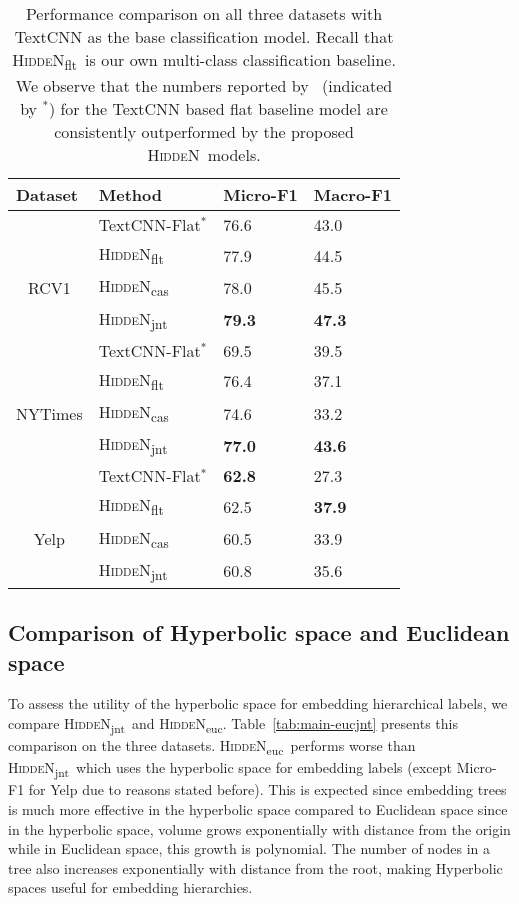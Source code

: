 \documentclass[11pt,a4paper]{article}
\newcommand{\model}{\mbox{\textsc{HiddeN}}}
\newcommand{\modeljnt}{\mbox{\textsc{HiddeN}\textsubscript{jnt}}}
\newcommand{\modelcas}{\mbox{\textsc{HiddeN}\textsubscript{cas}}}
\newcommand{\modelflt}{\mbox{\textsc{HiddeN}\textsubscript{flt}}}
\newcommand{\modeleuc}{\mbox{\textsc{HiddeN}\textsubscript{euc}}}
\begin{document}
\begin{table}[!ht]
\centering
\caption{Performance comparison on all three datasets with TextCNN as the base classification model. Recall that \modelflt\ is our own multi-class classification baseline.
We observe that the numbers reported by~\citet{emnlp} (indicated by $^*$) for the TextCNN based flat baseline model are consistently outperformed by the proposed \model\ models.}
\label{tab:main}
\begin{adjustbox}{max width=0.48\textwidth}
\begin{tabular}{llll} 
\toprule
\multicolumn{1}{l}{Dataset} & Method & Micro-F1 & Macro-F1 \\ 
\toprule
& TextCNN-Flat$^*$ & 76.6 & 43.0 \\
&\modelflt & 77.9 & 44.5 \\
\multicolumn{1}{c}{RCV1}&\modelcas & 78.0 & 45.5 \\
 & \modeljnt & \textbf{79.3} & \textbf{47.3} \\
\hline\hline
& TextCNN-Flat$^*$ & 69.5 & 39.5 \\
&\modelflt & 76.4 & 37.1 \\
\multicolumn{1}{c}{NYTimes}& \modelcas & 74.6 & 33.2 \\ 
 & {\modeljnt} & {\textbf{77.0}} & {\textbf{43.6}} \\

\hline\hline
& TextCNN-Flat$^*$ & \textbf{62.8} & 27.3 \\
&\modelflt & 62.5& \textbf{37.9}\\
\multicolumn{1}{c}{Yelp} & \modelcas  & 60.5 & 33.9\\
 & {\modeljnt } & 60.8 & 35.6 \\

\bottomrule
\end{tabular}
\end{adjustbox}
\end{table}

\subsection{Comparison of Hyperbolic space and Euclidean space}
To assess the utility of the hyperbolic space for embedding hierarchical labels, we compare \modeljnt\ and \modeleuc. Table~\ref{tab:main-eucjnt} presents this comparison on the three datasets. \modeleuc\ performs worse than \modeljnt\ which uses the hyperbolic space for embedding labels (except Micro-F1 for Yelp due to reasons stated before). This is expected since embedding trees is much more effective in the hyperbolic space compared to Euclidean space since in the hyperbolic space, volume grows exponentially with distance from the origin while in Euclidean space, this growth is polynomial. The number of nodes in a tree also increases exponentially with distance from the root, making Hyperbolic spaces useful for embedding hierarchies.
\end{document}
